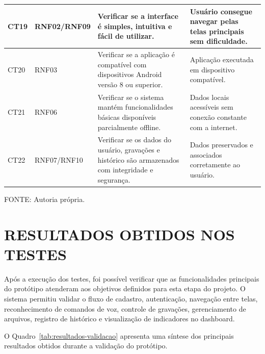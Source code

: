 \documentclass[12pt,oneside,a4paper,brazil,final]{abntex2}
\newcommand{\fontetabela}[1]{%
    \begin{center}
    {\fontsize{10}{12}\selectfont FONTE: #1}
    \end{center}
}
\begin{document}
\begin{longtable}{|p{1.5cm}|p{2.4cm}|p{5.8cm}|p{4.7cm}|}
\hline

CT19 & RNF02/\newline RNF09 & Verificar se a interface é simples, intuitiva e fácil de utilizar. & Usuário consegue navegar pelas telas principais sem dificuldade. \\

\hline

CT20 & RNF03 & Verificar se a aplicação é compatível com dispositivos Android versão 8 ou superior. & Aplicação executada em dispositivo compatível. \\

\hline

CT21 & RNF06 & Verificar se o sistema mantém funcionalidades básicas disponíveis parcialmente offline. & Dados locais acessíveis sem conexão constante com a internet. \\

\hline

CT22 & RNF07/\newline RNF10 & Verificar se os dados do usuário, gravações e histórico são armazenados com integridade e segurança. & Dados preservados e associados corretamente ao usuário. \\

\hline

\end{longtable}

\fontetabela{Autoria própria.}


\section{RESULTADOS OBTIDOS NOS TESTES}

Após a execução dos testes, foi possível verificar que as funcionalidades principais do protótipo atenderam aos objetivos definidos para esta etapa do projeto. O sistema permitiu validar o fluxo de cadastro, autenticação, navegação entre telas, reconhecimento de comandos de voz, controle de gravações, gerenciamento de arquivos, registro de histórico e visualização de indicadores no dashboard.

O Quadro~\ref{tab:resultados-validacao} apresenta uma síntese dos principais resultados obtidos durante a validação do protótipo.
\end{document}
